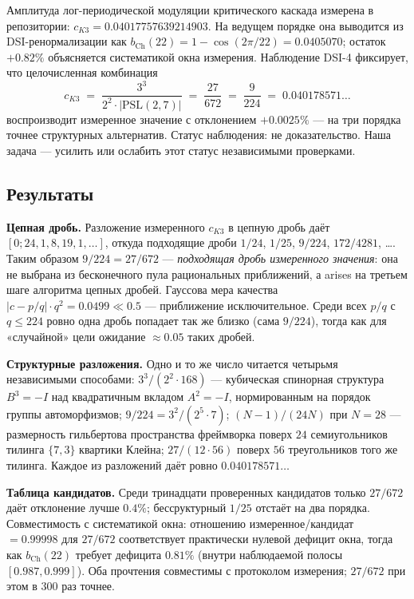 \documentclass[11pt,a4paper]{article}
\begin{document}
Амплитуда лог-периодической модуляции критического каскада измерена в
репозитории: $c_{K3} = 0.04017757639214903$. На ведущем порядке она выводится
из DSI-ренормализации как $b_{\mathrm{Ch}}(22) = 1 - \cos(2\pi/22) = 0.0405070$;
остаток $+0.82\%$ объясняется систематикой окна измерения. Наблюдение DSI-4
фиксирует, что целочисленная комбинация
\begin{equation}\label{eq:dsi4}
c_{K3} \;=\; \frac{3^3}{2^2\cdot|\mathrm{PSL}(2,7)|} \;=\; \frac{27}{672} \;=\; \frac{9}{224} \;=\; 0.040178571\ldots
\end{equation}
воспроизводит измеренное значение с отклонением $+0.0025\%$ --- на три порядка
точнее структурных альтернатив. Статус наблюдения: не доказательство. Наша
задача --- усилить или ослабить этот статус независимыми проверками.

\subsection{Результаты}

\textbf{Цепная дробь.} Разложение измеренного $c_{K3}$ в цепную дробь даёт
$[0; 24, 1, 8, 19, 1, \dots]$, откуда подходящие дроби
$1/24$, $1/25$, \emph{$9/224$}, $172/4281$, \dots. Таким образом $9/224 = 27/672$
--- \emph{подходящая дробь измеренного значения}: она не выбрана из
бесконечного пула рациональных приближений, а arises на третьем шаге алгоритма
цепных дробей. Гауссова мера качества $|c - p/q|\cdot q^2 = 0.0499 \ll 0.5$
--- приближение исключительное. Среди всех $p/q$ с $q \le 224$ ровно одна дробь
попадает так же близко (сама $9/224$), тогда как для «случайной» цели ожидание
$\approx 0.05$ таких дробей.

\textbf{Структурные разложения.} Одно и то же число читается четырьмя
независимыми способами: $3^3/(2^2\cdot168)$ --- кубическая спинорная структура
$B^3 = -I$ над квадратичным вкладом $A^2 = -I$, нормированным на порядок группы
автоморфизмов; $9/224 = 3^2/(2^5\cdot 7)$; $(N-1)/(24N)$ при $N = 28$ ---
размерность гильбертова пространства фреймворка поверх $24$ семиугольников
тилинга $\{7,3\}$ квартики Клейна; $27/(12\cdot 56)$ поверх $56$ треугольников
того же тилинга. Каждое из разложений даёт ровно $0.040178571\ldots$

\textbf{Таблица кандидатов.} Среди тринадцати проверенных кандидатов только
$27/672$ даёт отклонение лучше $0.4\%$; бессруктурный $1/25$ отстаёт на два
порядка. Совместимость с систематикой окна: отношению
измеренное/кандидат $= 0.99998$ для $27/672$ соответствует практически
нулевой дефицит окна, тогда как $b_{\mathrm{Ch}}(22)$ требует дефицита
$0.81\%$ (внутри наблюдаемой полосы $[0.987, 0.999]$). Оба прочтения совместимы
с протоколом измерения; $27/672$ при этом в $300$ раз точнее.
\end{document}
